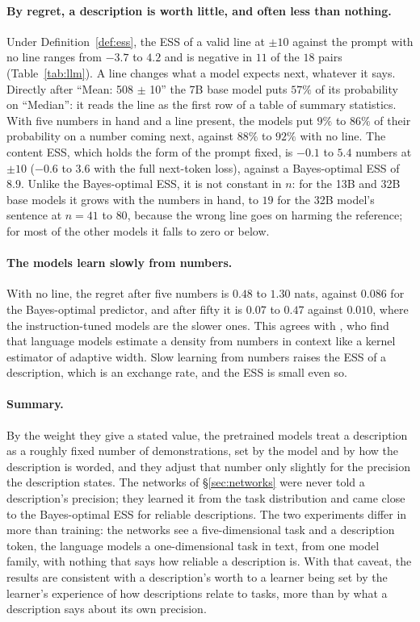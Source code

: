 \documentclass[10pt]{article}
\begin{document}
\paragraph{By regret, a description is worth little, and often less than nothing.} Under Definition~\ref{def:ess}, the ESS of a valid line at $\pm 10$ against the prompt with no line ranges from $-3.7$ to $4.2$ and is negative in $11$ of the $18$ pairs (Table~\ref{tab:llm}). A line changes what a model expects next, whatever it says. Directly after ``Mean: 508 $\pm$ 10'' the 7B base model puts $57\%$ of its probability on ``Median'': it reads the line as the first row of a table of summary statistics. With five numbers in hand and a line present, the models put $9\%$ to $86\%$ of their probability on a number coming next, against $88\%$ to $92\%$ with no line. The content ESS, which holds the form of the prompt fixed, is $-0.1$ to $5.4$ numbers at $\pm 10$ ($-0.6$ to $3.6$ with the full next-token loss), against a Bayes-optimal ESS of $8.9$. Unlike the Bayes-optimal ESS, it is not constant in $n$: for the 13B and 32B base models it grows with the numbers in hand, to $19$ for the 32B model's sentence at $n = 41$ to $80$, because the wrong line goes on harming the reference; for most of the other models it falls to zero or below.

\paragraph{The models learn slowly from numbers.} With no line, the regret after five numbers is $0.48$ to $1.30$ nats, against $0.086$ for the Bayes-optimal predictor, and after fifty it is $0.07$ to $0.47$ against $0.010$, where the instruction-tuned models are the slower ones. This agrees with \citet{liu2025}, who find that language models estimate a density from numbers in context like a kernel estimator of adaptive width. Slow learning from numbers raises the ESS of a description, which is an exchange rate, and the ESS is small even so.

\paragraph{Summary.} By the weight they give a stated value, the pretrained models treat a description as a roughly fixed number of demonstrations, set by the model and by how the description is worded, and they adjust that number only slightly for the precision the description states. The networks of \S\ref{sec:networks} were never told a description's precision; they learned it from the task distribution and came close to the Bayes-optimal ESS for reliable descriptions. The two experiments differ in more than training: the networks see a five-dimensional task and a description token, the language models a one-dimensional task in text, from one model family, with nothing that says how reliable a description is. With that caveat, the results are consistent with a description's worth to a learner being set by the learner's experience of how descriptions relate to tasks, more than by what a description says about its own precision.
\end{document}
